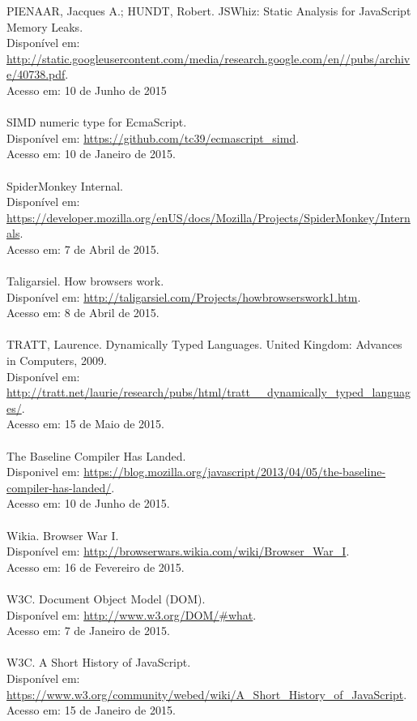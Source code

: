 \documentclass[12pt,a4paper]{article}
\begin{document}
PIENAAR, Jacques A.; HUNDT, Robert. JSWhiz: Static Analysis for JavaScript Memory Leaks. \\
Disponível em: \url{http://static.googleusercontent.com/media/research.google.com/en//pubs/archive/40738.pdf}. \\
Acesso em: 10 de Junho de 2015 \\
\\
SIMD numeric type for EcmaScript. \\
Disponível em: \url{https://github.com/tc39/ecmascript_simd}. \\
Acesso em: 10 de Janeiro de 2015. \\
\\
SpiderMonkey Internal. \\
Disponível em: \url{https://developer.mozilla.org/enUS/docs/Mozilla/Projects/SpiderMonkey/Internals}. \\
Acesso em: 7 de Abril de 2015. \\
\\
Taligarsiel. How browsers work. \\
Disponível em: \url{http://taligarsiel.com/Projects/howbrowserswork1.htm}. \\
Acesso em: 8 de Abril de 2015. \\
\\
TRATT, Laurence. Dynamically Typed Languages. United Kingdom: Advances in Computers, 2009. \\
Disponível em: \url{http://tratt.net/laurie/research/pubs/html/tratt__dynamically_typed_languages/}. \\
Acesso em: 15 de Maio de 2015. \\
\\
The Baseline Compiler Has Landed. \\
Disponivel em: \url{https://blog.mozilla.org/javascript/2013/04/05/the-baseline-compiler-has-landed/}. \\
Acesso em: 10 de Junho de 2015. \\
\\
Wikia. Browser War I. \\
Disponível em: \url{http://browserwars.wikia.com/wiki/Browser_War_I}. \\
Acesso em: 16 de Fevereiro de 2015. \\
\\
W3C. Document Object Model (DOM). \\
Disponível em: \url{http://www.w3.org/DOM/#what}. \\
Acesso em: 7 de Janeiro de 2015. \\
\\
W3C. A Short History of JavaScript. \\
Disponível em: \url{https://www.w3.org/community/webed/wiki/A_Short_History_of_JavaScript}. \\
Acesso em: 15 de Janeiro de 2015. \\
\end{document}
